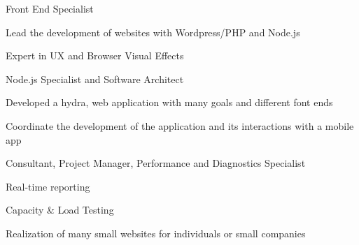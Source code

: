 \documentclass[letterpaper]{deedy-resume} %
\begin{document}
\begin{minipage}[t]{0.66\textwidth}
\sectionspace %


\begin{tightitemize}
\item Front End Specialist
\item Lead the development of websites with Wordpress/PHP and Node.js
\item Expert in UX and Browser Visual Effects
\end{tightitemize}

\sectionspace %


\begin{tightitemize}
\item Node.js Specialist and Software Architect
\item Developed a hydra, web application with many goals and different font ends
\item Coordinate the development of the application and its interactions with a mobile app
\end{tightitemize}

\sectionspace %


\begin{tightitemize}
\item Consultant, Project Manager, Performance and Diagnostics Specialist
\item Real-time reporting
\item Capacity \& Load Testing
\end{tightitemize}

\sectionspace %


\begin{tightitemize}
\item Realization of many small websites for individuals or small companies
\end{tightitemize}


\end{minipage}
\end{document}
